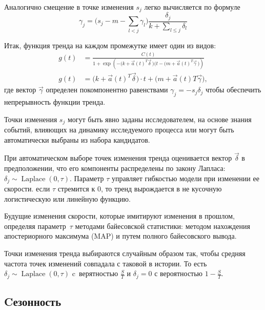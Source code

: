 \documentclass[a4paper,14pt]{extarticle}
\begin{document}
Аналогично смещение в точке изменения $s_j$ легко вычисляется по формуле
$$
    \gamma_j = \Big(s_j -m - \sum_{l<j} \gamma_l \Big) \frac{\delta_j}{k+\sum\limits_{l\leqslant j} \delta_l}
$$




Итак, функция тренда на каждом промежутке имеет один из видов:
\begin{align*}
    g(t) &= \frac{C(t)}{1+\exp\left(- \big(k+\vec{a}(t)^T\vec{\delta}\,\big) \big(t-(m+\vec{a}(t)^T\vec{\gamma}\,\big)\right)}\\
    g(t) &= \big(k + \vec{a}(t)^T\vec\delta\big)\cdot t + \big(m + \vec{a}(t)T\vec{\gamma}\big), 
\end{align*}
где вектор $\vec{\gamma}$ определен покомпонентно равенствами $\gamma_j = -s_j\delta_j$ чтобы обеспечить непрерывность функции тренда.


Точки изменения $s_j$ могут быть  явно заданы исследователем, на основе знания событий, влияющих на динамику исследуемого процесса или могут быть автоматически выбраны из набора кандидатов.

При автоматическом выборе точек изменения тренда оценивается вектор $\vec{\delta}$ в предположении, что его компоненты распределены по закону Лапласа: $\delta_j \sim \mathop{\mathrm{Laplace}}(0,\tau)$. 
Параметр $\tau$ управляет
гибкостью модели при изменении ее скорости. 
если $\tau$ стремится к 0, то тренд вырождается в не кусочную логистическую или линейную функцию.


Будущие изменения скорости, которые имитируют изменения в прошлом, определяя параметр~$\tau$ методами байесовской статистики: методом нахождения апостериорного максимума (MAP) и путем полного байесовского вывода. 




Точки изменения тренда выбираются случайным образом так, чтобы средняя частота точек изменений  совпадала с таковой в истории. То есть $\delta_j \sim \mathop{\mathrm{Laplace}}(0,\tau)$ c~верятностью $\frac{S}{T}$ и $\delta_j=0$ с вероятностью $1-\frac{S}{T}$.

\subsection{Cезонность}
\end{document}
